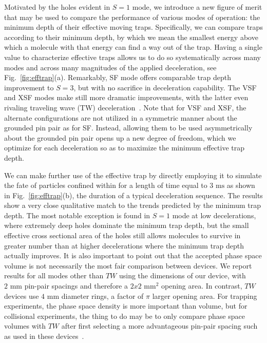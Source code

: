 \documentclass[%
 reprint,
 amsmath,amssymb,
 aps,
prl,
]{revtex4-1}
\begin{document}
Motivated by the holes evident in $S=1$ mode, we introduce a new figure of merit that may be used to compare the performance of various modes of operation: the minimum depth of their effective moving traps.
Specifically, we can compare traps according to their minimum depth, by which we mean the smallest energy above which a molecule with that energy can find a way out of the trap.
Having a single value to characterize effective traps allows us to do so systematically across many modes and across many magnitudes of the applied deceleration, see Fig.~\ref{fig:efftrap}(a). Remarkably, SF mode offers comparable trap depth improvement to $S=3$, but with no sacrifice in deceleration capability. 
The VSF and XSF modes make still more dramatic improvements, with the latter even rivaling traveling wave (TW) deceleration~\cite{}. 
Note that for VSF and XSF, the alternate configurations are not utilized in a symmetric manner about the grounded pin pair as for SF. 
Instead, allowing them to be used asymmetrically about the grounded pin pair opens up a new degree of freedom, which we optimize for each deceleration so as to maximize the minimum effective trap depth.

We can make further use of the effective trap by directly employing it to simulate the fate of particles confined within for a length of time equal to $3\text{ ms}$ as shown in Fig.~\ref{fig:efftrap}(b), the duration of a typical deceleration sequence. 
The results show a very close qualitative match to the trends predicted by the minimum trap depth. 
The most notable exception is found in $S=1$ mode at low decelerations, where extremely deep holes dominate the minimum trap depth, but the small effective cross sectional area of the holes still allows molecules to survive in greater number than at higher decelerations where the minimum trap depth actually improves.
It is also important to point out that the accepted phase space volume is not necessarily the most fair comparison between devices. 
We report results for all modes other than $TW$ using the dimensions of our device, with $2\text{ mm}$ pin-pair spacings and therefore a $2x2\text{ mm}^2$ opening area.
In contrast, $TW$ devices use $4\text{ mm}$ diameter rings, a factor of $\pi$ larger opening area.
For trapping experiments, the phase space density is more important than volume, but for collisional experiments, the thing to do may be to only compare phase space volumes with $TW$ after first selecting a more advantageous pin-pair spacing such as used in these devices~\cite{}.
\end{document}
